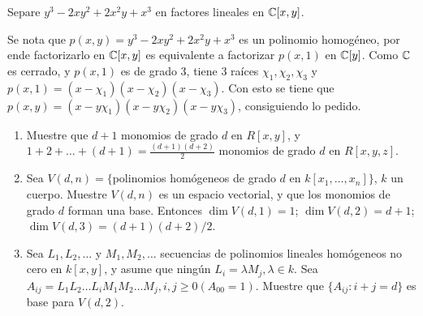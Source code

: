 \begin{sol}{2.24}

\end{sol}

\begin{prob}{2.33}
    Separe \(y^3-2xy^2+2x^2y+x^3\) en factores lineales en \(\mathbb{C}[x,y]\).
\end{prob}

\begin{sol}{2.33}
    Se nota que \(p(x,y)=y^3-2xy^2+2x^2y+x^3\) es un polinomio homogéneo, por ende factorizarlo en \(\mathbb{C}[x,y]\) es equivalente a factorizar \(p(x,1)\) en \(\mathbb{C}[y]\). Como \(\mathbb{C}\) es cerrado, y \(p(x,1)\) es de grado 3, tiene 3 raíces \(\chi_1,\chi_2,\chi_3\) y \(p(x,1)=(x-\chi_1)(x-\chi_2)(x-\chi_3)\). Con esto se tiene que \(p(x,y)=(x-y\chi_1)(x-y\chi_2)(x-y\chi_3)\), consiguiendo lo pedido.
\end{sol}

\begin{prob}{2.35}
    \begin{enumerate}
        \item Muestre que \(d+1\) monomios de grado \(d\) en \(R[x,y]\), y \(1+2+\dots +(d+1)=\frac{(d+1)(d+2)}2\) monomios de grado \(d\) en \(R[x,y,z]\).
        \item Sea \(V(d,n)=\{\)polinomios homógeneos de grado \(d\) en \(k[x_1,\dots ,x_n]\}\), \(k\) un cuerpo. Muestre \(V(d,n)\)  es un espacio vectorial, y que los monomios de grado \(d\) forman una base. Entonces \(\dim V(d,1)=1\); \(\dim V(d,2)=d+1\); \(\dim V(d,3)=(d+1)(d+2)/2\).
        \item Sea \(L_1,L_2,\dots \) y \(M_1,M_2,\dots \) secuencias de polinomios lineales homógeneos no cero en \(k[x,y]\), y asume que ningún \(L_i=\lambda M_j,\lambda\in k\). Sea \(A_{ij}=L_1L_2\dots L_iM_1M_2\dots M_j,i,j\geq0(A_{00}=1)\). Muestre que \(\{A_{ij}:i+j=d\}\) es base para \(V(d,2)\).
    \end{enumerate}
\end{prob}

